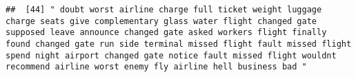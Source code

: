 \documentclass[
]{article}
\begin{document}
\begin{verbatim}
##  [44] " doubt worst airline charge full ticket weight luggage charge seats give complementary glass water flight changed gate supposed leave announce changed gate asked workers flight finally found changed gate run side terminal missed flight fault missed flight spend night airport changed gate notice fault missed flight wouldnt recommend airline worst enemy fly airline hell business bad "                                                                                                                                                                                                                                                                                                                                                                                                                                                                                                                                                                                                                                                                                                                                                                                                                                                                                                                                                                                                                                                                                                                                                                                                                                                                                                                                                                                              

\end{verbatim}
\end{document}

